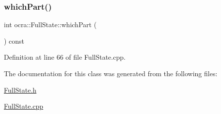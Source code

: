 \subsubsection{\texorpdfstring{which\+Part()}{whichPart()}}
{\footnotesize\ttfamily int ocra\+::\+Full\+State\+::which\+Part (\begin{DoxyParamCaption}{ }\end{DoxyParamCaption}) const\hspace{0.3cm}{\ttfamily [protected]}}



Definition at line 66 of file Full\+State.\+cpp.



The documentation for this class was generated from the following files\+:\begin{DoxyCompactItemize}
\item 
\hyperlink{FullState_8h}{Full\+State.\+h}\item 
\hyperlink{FullState_8cpp}{Full\+State.\+cpp}\end{DoxyCompactItemize}
